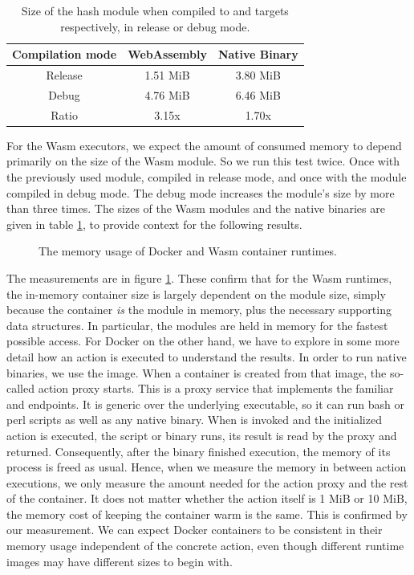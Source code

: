 \begin{table}[h!]
    \centering
    \begin{tabular}{c | c | c}
        Compilation mode & WebAssembly & Native Binary\\
        \hline
        Release & 1.51 MiB & 3.80 MiB\\
        Debug   & 4.76 MiB & 6.46 MiB\\
        \hline
        Ratio   & 3.15x    & 1.70x\\
    \end{tabular}
    \caption{Size of the hash module when compiled to  and  targets respectively, in release or debug mode.}
    \label{table:hash-binary-size}
\end{table}

For the Wasm executors, we expect the amount of consumed memory to depend primarily on the size of the Wasm module. So we run this test twice. Once with the previously used  module, compiled in release mode, and once with the module compiled in debug mode. The debug mode increases the module's size by more than three times. The sizes of the Wasm modules and the native binaries are given in table \ref{table:hash-binary-size}, to provide context for the following results.

\begin{figure}
    \begin{center}
        
    \end{center}
    \caption{The memory usage of Docker and Wasm container runtimes.}
    \label{fig:pc-memory}
\end{figure}

The measurements are in figure \ref{fig:pc-memory}. These confirm that for the Wasm runtimes, the in-memory container size is largely dependent on the module size, simply because the container \emph{is} the module in memory, plus the necessary supporting data structures. In particular, the modules are held in memory for the fastest possible access. For Docker on the other hand, we have to explore in some more detail how an action is executed to understand the results. In order to run native binaries, we use the  image. When a container is created from that image, the so-called action proxy starts. This is a proxy service that implements the familiar  and  endpoints. It is generic over the underlying executable, so it can run bash or perl scripts as well as any native binary. When  is invoked and the initialized action is executed, the script or binary runs, its result is read by the proxy and returned. Consequently, after the binary finished execution, the memory of its process is freed as usual. Hence, when we measure the memory in between action executions, we only measure the amount needed for the action proxy and the rest of the container. It does not matter whether the action itself is 1 MiB or 10 MiB, the memory cost of keeping the container warm is the same. This is confirmed by our measurement. We can expect Docker containers to be consistent in their memory usage independent of the concrete action, even though different runtime images may have different sizes to begin with.

